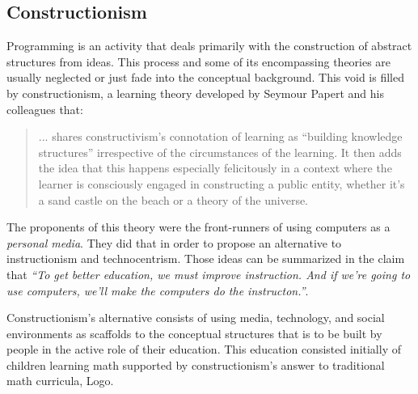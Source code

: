 \subsection{Constructionism}

Programming is an activity that deals primarily with the construction
of abstract structures from ideas. This process and some of its encompassing
theories are usually neglected or just fade into the conceptual
background. This void is filled by constructionism, a learning theory
developed by Seymour Papert and his colleagues that:

\begin{quote}
  ... shares constructivism's connotation of learning as ``building
  knowledge structures'' irrespective of the circumstances of the
  learning. It then adds the idea that this happens especially
  felicitously in a context where the learner is consciously engaged in
  constructing a public entity, whether it's a sand castle on the beach
  or a theory of the universe.
  \cite{education:papert__situating_constructionism}
\end{quote}

The proponents of this theory were the front-runners of using
computers as a \emph{personal media}. They did that in order to
propose an alternative to instructionism and technocentrism. Those
ideas can be summarized in the claim that \emph{``To get better
  education, we must improve instruction. And if we're going to use
  computers, we'll make the computers do the
  instructon.''}. \cite{education:papert__constructionism_instructionism} 

Constructionism's alternative consists of using media, technology, and
social environments as scaffolds to the conceptual structures that is
to be built by people in the active role of their education. This
education consisted initially of children learning math supported by
constructionism's answer to traditional math curricula, Logo. 

